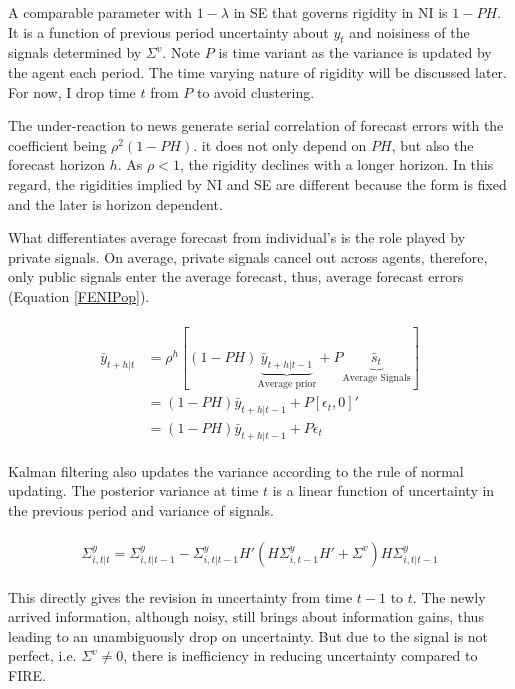 \documentclass[12pt]{article}
\begin{document}
	
	A comparable parameter with $1-\lambda$ in SE that governs rigidity in NI is $1-PH$. It is a function of previous period uncertainty about $y_t$ and noisiness of the signals determined by $\Sigma^v$. Note $P$ is time variant as the variance is updated by the agent each period. The time varying nature of rigidity will be discussed later. For now, I drop time $t$ from $P$ to avoid clustering.  
	
	The under-reaction to news generate serial correlation of forecast errors with the coefficient being $\rho^2(1-PH)$. it does not only depend on $PH$, but also the forecast horizon $h$. As $\rho<1$, the rigidity declines with a longer horizon. In this regard, the rigidities implied by NI and SE are different because the form is fixed and the later is horizon dependent. 
	
	What differentiates average forecast from individual's is the role played by private signals. On average, private signals cancel out across agents, therefore, only public signals enter the average forecast, thus, average forecast errors (Equation \ref{FENIPop}). 
	
	\begin{eqnarray}\label{FENIPop}
		\begin{aligned}
			\bar y_{t+h|t} & = \rho^h [(1-PH) \underbrace{\bar  y_{t+h|t-1}}_{\text{Average prior}} + P \underbrace{\bar s_{t}}_{\text{Average Signals}}] \\
			& = (1-PH) \bar y_{t+h|t-1}+ P [\epsilon_t, 0]' \\
			& = (1-PH) \bar y_{t+h|t-1} + P \epsilon_t
		\end{aligned}
	\end{eqnarray}
	
	Kalman filtering also updates the variance according to the rule of normal updating.   The posterior variance at time $t$ is a linear function of uncertainty in the previous period and variance of signals. 
	
	\begin{eqnarray}
		\begin{aligned}
			\Sigma^y_{i,t|t} = \Sigma^y_{i,t|t-1} - \Sigma^y_{i,t|t-1} H'(H \Sigma^y_{i,t-1} H' +\Sigma^v) H \Sigma^y_{i,t|t-1} 
		\end{aligned}
	\end{eqnarray}
	
	This directly gives the revision in uncertainty from time $t-1$ to $t$. The newly arrived information, although noisy, still brings about information gains, thus leading to an unambiguously drop on uncertainty. But due to the signal is not perfect, i.e. $\Sigma^v \neq 0$, there is inefficiency in reducing uncertainty compared to FIRE. 
	
\end{document}
